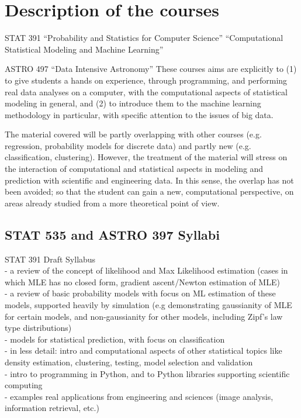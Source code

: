 \section{Description of the courses}
\label{sec:course-descr}

\bit
\item STAT 391 ``Probability and Statistics for Computer Science''
``Computational Statistical Modeling and Machine Learning''
\item ASTRO 497 ``Data Intensive Astronomy'' 
\eit 
These courses aims are explicitly to (1) to give students a hands on experience, through programming, and performing real data analyses on a computer, with the computational aspects of 
statistical modeling in general, and (2) to introduce them to the  machine learning methodology in particular, with specific attention to the issues of big data.

The material covered will be partly overlapping with other courses
(e.g. regression, probability models for discrete data) and partly new
(e.g. classification, clustering). However, the treatment of the
material will stress on the interaction of computational and
statistical aspects in modeling and prediction with scientific and
engineering data. In this sense, the overlap has not been avoided; so that
the student can gain a new, computational perspective, on areas
already studied from a more theoretical point of view. 


\subsection{STAT 535 and ASTRO 397 Syllabi}

\bit
\item STAT 391 Draft Syllabus\\
- a review of the concept of likelihood and Max Likelihood estimation (cases in which MLE has no closed form, gradient ascent/Newton estimation of MLE)\\
- a review of basic probability models with focus on ML estimation of these models, supported heavily by simulation (e.g demonstrating gaussianity of MLE for certain models, and non-gaussianity for other models, including Zipf's law type distributions)\\
- models for statistical prediction, with focus on classification\\
- in less detail: intro and computational aspects of other statistical topics like density estimation, clustering, testing, model selection and validation\\
- intro to programming in Python, and to Python libraries supporting scientific computing\\
- examples real applications from engineering and sciences (image analysis, information retrieval, etc.)


